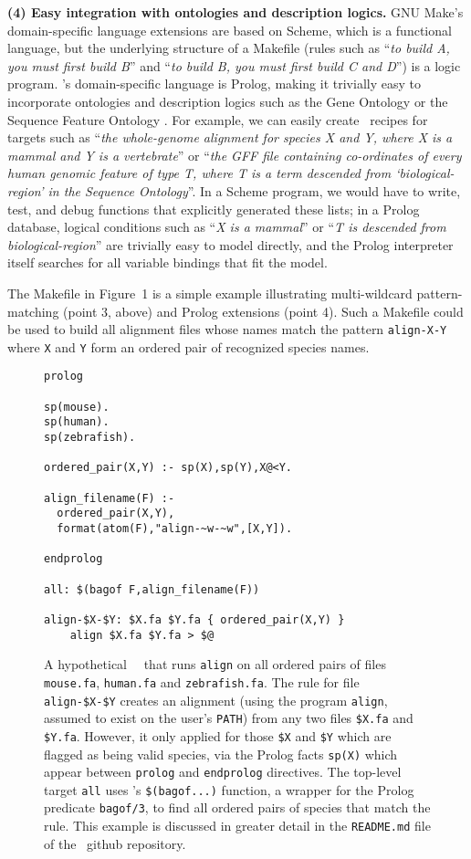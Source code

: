 {\bf (4) Easy integration with ontologies and description logics.}
GNU Make's domain-specific language extensions are based on Scheme, which is a functional language,
but the underlying structure of a Makefile (rules such as ``{\em to build A, you must first build B}'' and ``{\em to build B, you must first build C and D}'')
is a logic program.
\biomake's domain-specific language is Prolog, making it trivially easy to incorporate ontologies and description logics
such as the Gene Ontology \citep{GeneOntology2015} or the Sequence Feature Ontology \citep{SequenceOntology2005}.
For example, we can easily create \biomake\ recipes for targets such as ``{\em the whole-genome alignment for species X and Y, where X is a mammal and Y is a vertebrate}''
or ``{\em the GFF file containing co-ordinates of every human genomic feature of type T, where T is a term descended from `biological-region' in the Sequence Ontology}''.
In a Scheme program, we would have to write, test, and debug functions that explicitly generated these lists;
in a Prolog database, logical conditions such as ``{\em X is a mammal}'' or ``{\em T is descended from biological-region}'' are trivially easy to model directly,
and the Prolog interpreter itself searches for all variable bindings that fit the model.

The Makefile in Figure~1 is a simple example illustrating multi-wildcard pattern-matching (point 3, above) and Prolog extensions (point 4).
Such a Makefile could be used to build all alignment files whose names match the pattern {\tt align-X-Y} where {\tt X} and {\tt Y} form an ordered pair of recognized species names.

\begin{figure}[H]
\begin{Verbatim}[frame=single]
prolog

sp(mouse).
sp(human).
sp(zebrafish).

ordered_pair(X,Y) :- sp(X),sp(Y),X@<Y.

align_filename(F) :-
  ordered_pair(X,Y),
  format(atom(F),"align-~w-~w",[X,Y]).

endprolog

all: $(bagof F,align_filename(F))

align-$X-$Y: $X.fa $Y.fa { ordered_pair(X,Y) }
    align $X.fa $Y.fa > $@
\end{Verbatim}
\caption{
  A hypothetical \biomake\ \Makefile\ that runs {\tt align} on all ordered pairs of files
  {\tt mouse.fa}, {\tt human.fa} and {\tt zebrafish.fa}.
The rule for file {\tt align-\$X-\$Y} creates an alignment (using the program {\tt align}, assumed to exist on the user's {\tt PATH})
from any two files {\tt \$X.fa} and {\tt \$Y.fa}.
However, it only applied for those {\tt \$X} and {\tt \$Y} which are flagged as being valid species, via the Prolog facts {\tt sp(X)}
which appear between {\tt prolog} and {\tt endprolog} directives.
The top-level target {\tt all} uses \biomake's {\tt \$(bagof...)} function, a wrapper for the Prolog predicate {\tt bagof/3},
to find all ordered pairs of species that match the rule.
This example is discussed in greater detail in the {\tt README.md} file of the \biomake\ github repository.
}
\end{figure}

